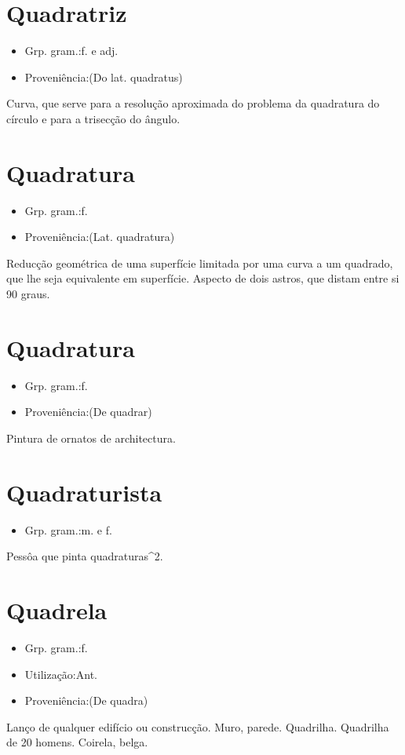 \section{Quadratriz}
\begin{itemize}
\item {Grp. gram.:f.  e  adj.}
\end{itemize}
\begin{itemize}
\item {Proveniência:(Do lat. \textunderscore quadratus\textunderscore )}
\end{itemize}
Curva, que serve para a resolução aproximada do problema da quadratura do círculo e para a trisecção do ângulo.
\section{Quadratura}
\begin{itemize}
\item {Grp. gram.:f.}
\end{itemize}
\begin{itemize}
\item {Proveniência:(Lat. \textunderscore quadratura\textunderscore )}
\end{itemize}
Reducção geométrica de uma superfície limitada por uma curva a um quadrado, que lhe seja equivalente em superfície.
Aspecto de dois astros, que distam entre si 90 graus.
\section{Quadratura}
\begin{itemize}
\item {Grp. gram.:f.}
\end{itemize}
\begin{itemize}
\item {Proveniência:(De \textunderscore quadrar\textunderscore )}
\end{itemize}
Pintura de ornatos de architectura.
\section{Quadraturista}
\begin{itemize}
\item {Grp. gram.:m.  e  f.}
\end{itemize}
Pessôa que pinta quadraturas^2.
\section{Quadrela}
\begin{itemize}
\item {Grp. gram.:f.}
\end{itemize}
\begin{itemize}
\item {Utilização:Ant.}
\end{itemize}
\begin{itemize}
\item {Proveniência:(De \textunderscore quadra\textunderscore )}
\end{itemize}
Lanço de qualquer edifício ou construcção.
Muro, parede.
Quadrilha.
Quadrilha de 20 homens.
Coirela, belga.
